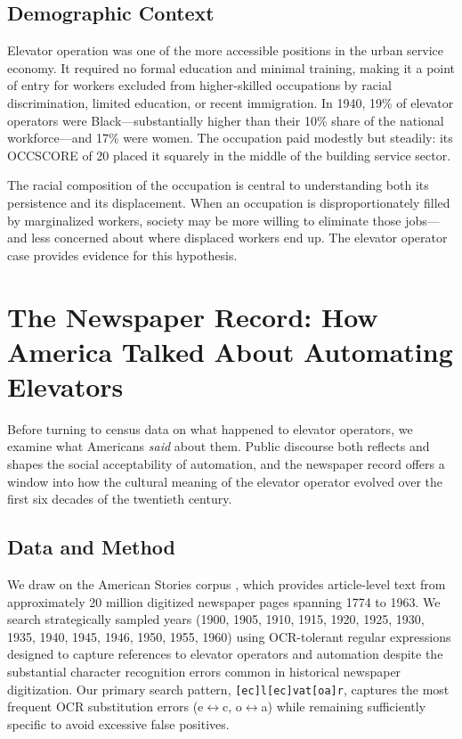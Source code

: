 \documentclass[12pt]{article}
\begin{document}
\subsection{Demographic Context}

Elevator operation was one of the more accessible positions in the urban service economy. It required no formal education and minimal training, making it a point of entry for workers excluded from higher-skilled occupations by racial discrimination, limited education, or recent immigration. In 1940, 19\% of elevator operators were Black---substantially higher than their 10\% share of the national workforce---and 17\% were women. The occupation paid modestly but steadily: its OCCSCORE of 20 placed it squarely in the middle of the building service sector.

The racial composition of the occupation is central to understanding both its persistence and its displacement. When an occupation is disproportionately filled by marginalized workers, society may be more willing to eliminate those jobs---and less concerned about where displaced workers end up. The elevator operator case provides evidence for this hypothesis.



\section{The Newspaper Record: How America Talked About Automating Elevators} \label{sec:newspaper}

Before turning to census data on what happened to elevator operators, we examine what Americans \emph{said} about them. Public discourse both reflects and shapes the social acceptability of automation, and the newspaper record offers a window into how the cultural meaning of the elevator operator evolved over the first six decades of the twentieth century.

\subsection{Data and Method}

We draw on the American Stories corpus \citep{dell2023}, which provides article-level text from approximately 20 million digitized newspaper pages spanning 1774 to 1963. We search strategically sampled years (1900, 1905, 1910, 1915, 1920, 1925, 1930, 1935, 1940, 1945, 1946, 1950, 1955, 1960) using OCR-tolerant regular expressions designed to capture references to elevator operators and automation despite the substantial character recognition errors common in historical newspaper digitization. Our primary search pattern, \texttt{[ec]l[ec]vat[oa]r}, captures the most frequent OCR substitution errors (e$\leftrightarrow$c, o$\leftrightarrow$a) while remaining sufficiently specific to avoid excessive false positives.
\end{document}
